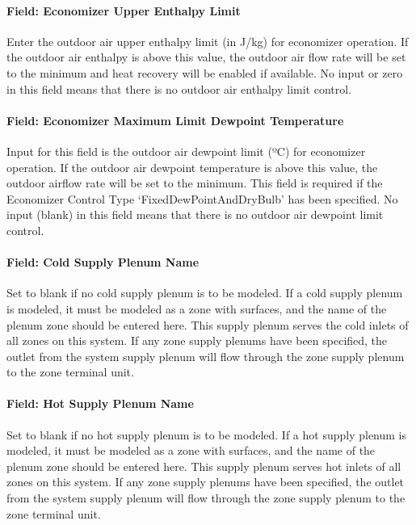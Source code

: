 \paragraph{Field: Economizer Upper Enthalpy Limit}\label{field-economizer-upper-enthalpy-limit-3}

Enter the outdoor air upper enthalpy limit (in J/kg) for economizer operation. If the outdoor air enthalpy is above this value, the outdoor air flow rate will be set to the minimum and heat recovery will be enabled if available. No input or zero in this field means that there is no outdoor air enthalpy limit control.

\paragraph{Field: Economizer Maximum Limit Dewpoint Temperature}\label{field-economizer-maximum-limit-dewpoint-temperature-6}

Input for this field is the outdoor air dewpoint limit (ºC) for economizer operation. If the outdoor air dewpoint temperature is above this value, the outdoor airflow rate will be set to the minimum. This field is required if the Economizer Control Type `FixedDewPointAndDryBulb' has been specified. No input (blank) in this field means that there is no outdoor air dewpoint limit control.

\paragraph{Field: Cold Supply Plenum Name}\label{field-cold-supply-plenum-name-1}

Set to blank if no cold supply plenum is to be modeled. If a cold supply plenum is modeled, it must be modeled as a zone with surfaces, and the name of the plenum zone should be entered here. This supply plenum serves the cold inlets of all zones on this system. If any zone supply plenums have been specified, the outlet from the system supply plenum will flow through the zone supply plenum to the zone terminal unit.

\paragraph{Field: Hot Supply Plenum Name}\label{field-hot-supply-plenum-name-1}

Set to blank if no hot supply plenum is to be modeled. If a hot supply plenum is modeled, it must be modeled as a zone with surfaces, and the name of the plenum zone should be entered here. This supply plenum serves hot inlets of all zones on this system. If any zone supply plenums have been specified, the outlet from the system supply plenum will flow through the zone supply plenum to the zone terminal unit.

